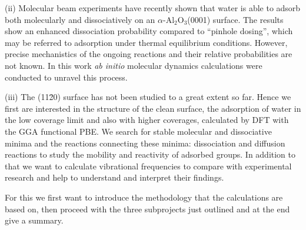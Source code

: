 \documentclass[11pt,DIV=13,BCOR=5mm,a4paper,headinclude]{scrbook}
\begin{document}
(ii) Molecular beam experiments have recently shown that water is able to adsorb both molecularly and dissociatively on an $\alpha$-Al$_{\text{2}}$O$_{\text{3}}$(0001) surface\cite{Wirth2014}.
The results show an enhanced dissociation probability compared to ``pinhole dosing'', which may be referred to adsorption under thermal equilibrium conditions.
However, precise mechanistics of the ongoing reactions  and their relative probabilities are not known.
In this work \textit{ab initio} molecular dynamics calculations were conducted to unravel this process.


(iii) The (11\=20) surface has not been studied to a great extent so far.
Hence we first are interested in the structure of the clean surface, the adsorption of water in the low coverage limit and also with higher coverages, calculated by DFT with the GGA functional PBE.
We search for stable molecular and dissociative minima and the reactions connecting these minima: dissociation and diffusion reactions to study the mobility and reactivity of adsorbed groups.
In addition to that we want to calculate vibrational frequencies to compare with experimental research and help to understand and interpret their findings.


For this we first want to introduce the methodology that the calculations are based on, then proceed with the three subprojects just outlined and at the end give a summary.

\end{document}
